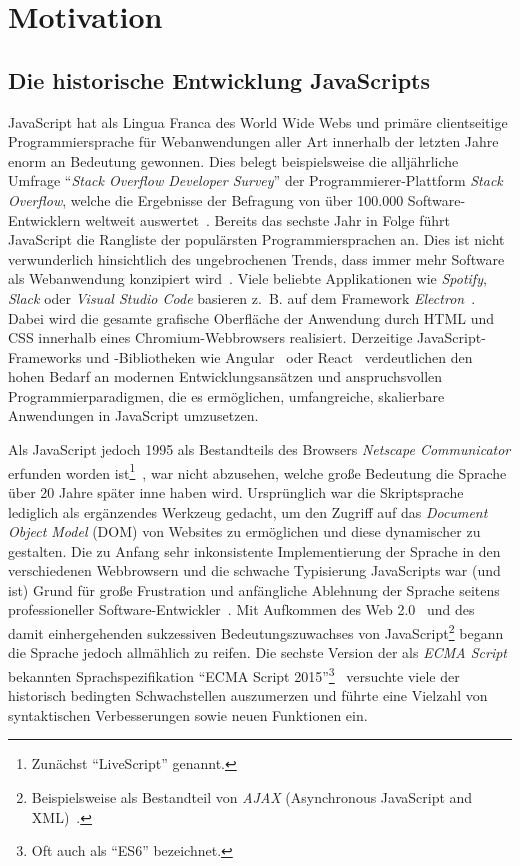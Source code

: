 \chapter{Motivation}

\section{Die historische Entwicklung JavaScripts}

JavaScript hat als Lingua Franca des World Wide Webs und primäre clientseitige Programmiersprache für Webanwendungen aller Art innerhalb der letzten Jahre enorm an Bedeutung gewonnen. Dies belegt beispielsweise die alljährliche Umfrage \enquote{\emph{Stack Overflow Developer Survey}} der Programmierer-Plattform \emph{Stack Overflow}, welche die Ergebnisse der Befragung von über 100.000 Software-Entwicklern weltweit auswertet~\autocite{stackoverflow:survey:2018}. Bereits das sechste Jahr in Folge führt JavaScript die Rangliste der populärsten Programmiersprachen an. Dies ist nicht verwunderlich hinsichtlich des ungebrochenen Trends, dass immer mehr Software als Webanwendung konzipiert wird~\autocite{taivalsaari:2017}\autocite{casteleyn:2014:ria}. Viele beliebte Applikationen wie \emph{Spotify}, \emph{Slack} oder \emph{Visual Studio Code} basieren z.~B. auf dem Framework \emph{Electron}~\autocite{electron}. Dabei wird die gesamte grafische Oberfläche der Anwendung durch HTML und CSS innerhalb eines Chromium-Webbrowsers realisiert. Derzeitige JavaScript-Frameworks und -Bibliotheken wie Angular~\autocite{angular} oder React~\autocite{react} verdeutlichen den hohen Bedarf an modernen Entwicklungsansätzen und anspruchsvollen Programmierparadigmen, die es ermöglichen, umfangreiche, skalierbare Anwendungen in JavaScript umzusetzen.

Als JavaScript jedoch 1995 als Bestandteils des Browsers \emph{Netscape Communicator} erfunden worden ist\footnote{Zunächst \enquote{LiveScript} genannt.}~\autocite{severance:2012:js10days}, war nicht abzusehen, welche große Bedeutung die Sprache über 20 Jahre später inne haben wird. Ursprünglich war die Skriptsprache lediglich als ergänzendes Werkzeug gedacht, um den Zugriff auf das \emph{Document Object Model} (DOM) von Websites zu ermöglichen und diese dynamischer zu gestalten.
Die zu Anfang sehr inkonsistente Implementierung der Sprache in den verschiedenen Webbrowsern und die schwache Typisierung JavaScripts war (und ist) Grund für große Frustration und anfängliche Ablehnung der Sprache seitens professioneller Software-Entwickler~\autocite{oreilly:2001:js}.
Mit Aufkommen des Web 2.0~\autocite{oreilly:2005:web20} und des damit einhergehenden sukzessiven Bedeutungszuwachses von JavaScript\footnote{Beispielsweise als Bestandteil von \emph{AJAX} (Asynchronous JavaScript and XML)~\autocite{garret:ajax}.} begann die Sprache jedoch allmählich zu reifen. Die sechste Version der als \emph{ECMA Script} bekannten Sprachspezifikation \enquote{ECMA Script 2015}\footnote{Oft auch als \enquote{ES6} bezeichnet.}~\autocite{ecmascript:2015} versuchte viele der historisch bedingten Schwachstellen auszumerzen und führte eine Vielzahl von syntaktischen Verbesserungen sowie neuen Funktionen ein.

